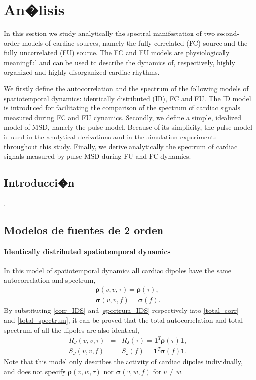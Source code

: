 
\chapter{An�lisis}

\begin{resumen}
 In this section we study analytically the spectral manifestation of two
 second-order models of cardiac sources, namely the fully correlated (FC) source
 and the fully uncorrelated (FU) source.  The FC and FU models are
 physiologically meaningful and can be used to describe the dynamics of,
 respectively, highly organized and highly disorganized cardiac rhythms.

 We firstly define the autocorrelation and the spectrum of the following models
 of spatiotemporal dynamics: identically distributed (ID), FC and FU. The ID
 model is introduced for facilitating the comparison of the spectrum of cardiac
 signals measured during FC and FU dynamics. Secondly, we define a simple,
 idealized model of MSD, namely the pulse model. Because of its simplicity, the
 pulse model is used in the analytical derivations and in the simulation
 experiments throughout this study. Finally, we derive analytically the spectrum
 of cardiac signals measured by pulse MSD during FU and FC dynamics.


\end{resumen}

\section{Introducci�n}
.

\section{Modelos de fuentes de 2 orden}
\subsubsection{Identically distributed spatiotemporal dynamics}
In this model of spatiotemporal dynamics all cardiac dipoles have the same autocorrelation and spectrum, 
\begin{eqnarray}
\boldsymbol{\rho}(v,v,\tau)=\boldsymbol{\rho}(\tau), \label{corr_IDS}\\
\boldsymbol{\sigma}(v,v,f)=\boldsymbol{\sigma}(f). \label{spectrum_IDS}
\end{eqnarray}
By substituting \eqref{corr_IDS} and \eqref{spectrum_IDS} respectively into \eqref{total_corr} and \eqref{total_spectrum}, it can be proved that the total autocorrelation and total spectrum of all the dipoles are also identical, 
\begin{eqnarray}
R_{J}(v,v,\tau)&=&R_{J}(\tau)=\mathbf{1}^{T} \boldsymbol{\rho}(\tau)  \mathbf{1},\label{total_corr_IDS}\\ 
S_{J}(v,v,f)&=&S_{J}(f)=\mathbf{1}^{T} \boldsymbol{\sigma}(f)  \mathbf{1}. \label{total_spectrum_IDS}
\end{eqnarray}
Note that this model only describes the activity of cardiac dipoles individually, and does not specify $\boldsymbol{\rho}(v,w,\tau)$ nor $\boldsymbol{\sigma}(v,w,f)$ for $v\neq w$.


